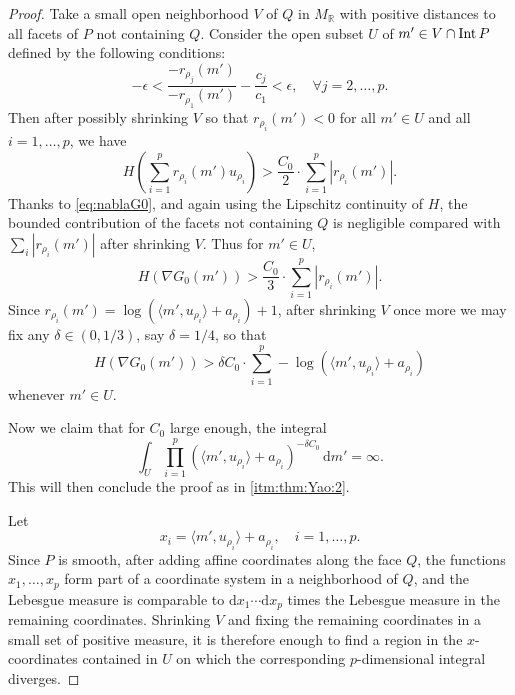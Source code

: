 \begin{proof}
    Take a small open neighborhood $V$ of $Q$ in $M_{\mathbb{R}}$ with positive distances to all facets of $P$ not containing $Q$.
    Consider the open subset $U$ of $m'\in V\cap \operatorname{Int} P$ defined by the following conditions:
    \begin{equation}\label{eq:rrhojrrho1est_temp1}
    -\epsilon< \frac{-r_{\rho_j}(m')}{-r_{\rho_1}(m')}-\frac{c_j}{c_1}< \epsilon,\quad \forall j=2,\ldots,p.
    \end{equation}
    Then after possibly shrinking $V$ so that $r_{\rho_i}(m')<0$ for all $m'\in U$ and all $i=1,\ldots,p$, we have
    \[
    H\left(\sum_{i=1}^p r_{\rho_i}(m') u_{\rho_i}\right)> \frac{C_0}{2}\cdot \sum_{i=1}^p \left|r_{\rho_i}(m')\right|.
    \]
    Thanks to \eqref{eq:nablaG0}, and again using the Lipschitz continuity of $H$, the bounded contribution of the facets not containing $Q$ is negligible compared with $\sum_i |r_{\rho_i}(m')|$ after shrinking $V$. Thus for $m'\in U$,
    \[
    H(\nabla G_0(m'))> \frac{C_0}{3}\cdot \sum_{i=1}^p \left|r_{\rho_i}(m')\right|.
    \]
    Since $r_{\rho_i}(m')=\log \left(\langle m',u_{\rho_i}\rangle+a_{\rho_i}\right)+1$, after shrinking $V$ once more we may fix any $\delta\in (0,1/3)$, say $\delta=1/4$, so that
    \[
    H(\nabla G_0(m'))> \delta C_0 \cdot \sum_{i=1}^p -\log \left( \langle m',u_{\rho_i}\rangle +a_{\rho_i}\right)
    \]
    whenever $m'\in U$.

    Now we claim that for $C_0$ large enough, the integral
    \begin{equation}\label{eq:intUinf_multiterm}
    \int_U \prod_{i=1}^p \left( \langle m',u_{\rho_i}\rangle +a_{\rho_i}\right)^{-\delta C_0}\,\mathrm{d}m'=\infty.
    \end{equation}
    This will then conclude the proof as in \ref{itm:thm:Yao:2}.

    Let
    \[
        x_i=\langle m',u_{\rho_i}\rangle+a_{\rho_i},\quad i=1,\ldots,p.
    \]
    Since $P$ is smooth, after adding affine coordinates along the face $Q$, the functions $x_1,\ldots,x_p$ form part of a coordinate system in a neighborhood of $Q$, and the Lebesgue measure is comparable to $\mathrm{d}x_1\cdots \mathrm{d}x_p$ times the Lebesgue measure in the remaining coordinates. Shrinking $V$ and fixing the remaining coordinates in a small set of positive measure, it is therefore enough to find a region in the $x$-coordinates contained in $U$ on which the corresponding $p$-dimensional integral diverges.


\end{proof}
